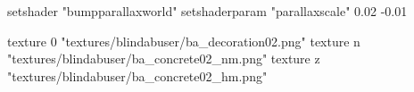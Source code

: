 	setshader "bumpparallaxworld"
	setshaderparam "parallaxscale" 0.02 -0.01

		texture 0 "textures/blindabuser/ba_decoration02.png"
		texture n "textures/blindabuser/ba_concrete02_nm.png"
		texture z "textures/blindabuser/ba_concrete02_hm.png"
